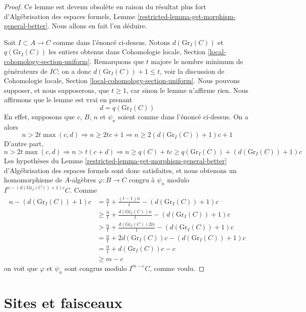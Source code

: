 \begin{proof}
Ce lemme est devenu obsol\`ete en raison du r\'esultat plus fort
d'Alg\'ebrisation des espaces formels,
Lemme \ref{restricted-lemma-get-morphism-general-better}.
Nous allons en fait l'en d\'eduire.

\medskip\noindent
Soit $I \subset A \to C$ comme dans l'\'enonc\'e ci-dessus.
Notons $d(\text{Gr}_I(C))$ et $q(\text{Gr}_I(C))$ les entiers obtenus dans
Cohomologie locale, Section \ref{local-cohomology-section-uniform}.
Remarquons que $t$ majore le nombre minimum de g\'en\'erateurs de $IC$;
on a donc $d(\text{Gr}_I(C)) + 1 \leq t$, voir la discussion de
Cohomologie locale, Section \ref{local-cohomology-section-uniform}.
Nous pouvons supposer, et nous supposerons, que $t \geq 1$, car sinon le lemme
n'affirme rien. Nous affirmons que le lemme est vrai en prenant
$$
d = q(\text{Gr}_I(C))
$$
En effet, supposons que $c$, $B$, $n$ et $\psi_n$ soient comme dans l'\'enonc\'e
ci-dessus. On a alors
$$
n > 2t\max(c, d) \Rightarrow n \geq 2tc + 1 \Rightarrow
n \geq 2(d(\text{Gr}_I(C)) + 1)c + 1
$$
D'autre part,
$$
n > 2t\max(c, d) \Rightarrow n > t(c + d) \Rightarrow
n \geq q(C) + tc \geq q(\text{Gr}_I(C)) + (d(\text{Gr}_I(C)) + 1)c
$$
Les hypoth\`eses du Lemme \ref{restricted-lemma-get-morphism-general-better}
d'Alg\'ebrisation des espaces formels sont donc satisfaites,
et nous obtenons un homomorphisme de $A$-alg\`ebres
$\varphi : B \to C$ congru \`a $\psi_n$
modulo $I^{n - (d(\text{Gr}_I(C)) + 1)c}C$.
Comme
\begin{align*}
n - (d(\text{Gr}_I(C)) + 1)c
& = \frac{n}{t} + \frac{(t - 1)n}{t} - (d(\text{Gr}_I(C)) + 1)c \\
& \geq \frac{n}{t} + \frac{d(\text{Gr}_I(C))n}{t} - (d(\text{Gr}_I(C)) + 1)c \\
& > \frac{n}{t} + \frac{d(\text{Gr}_I(C))2tc}{t} - (d(\text{Gr}_I(C)) + 1)c \\
& = \frac{n}{t} + 2d(\text{Gr}_I(C))c - (d(\text{Gr}_I(C)) + 1)c \\
& = \frac{n}{t} + d(\text{Gr}_I(C))c - c \\
& \geq m - c
\end{align*}
on voit que $\varphi$ et $\psi_n$ sont congrus modulo $I^{m - c}C$, comme voulu.
\end{proof}
\section{Sites et faisceaux}
\label{section-sites}

